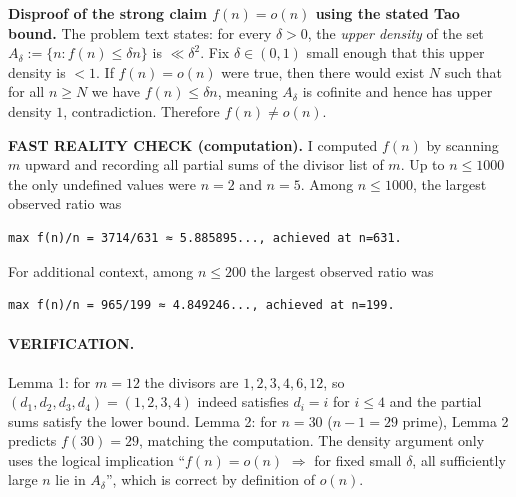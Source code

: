 \textbf{Disproof of the strong claim $f(n)=o(n)$ using the stated Tao bound.}
The problem text states: for every $\delta>0$, the \emph{upper density} of the set
$A_\delta:=\{n: f(n)\le \delta n\}$ is $\ll \delta^2$.
Fix $\delta\in(0,1)$ small enough that this upper density is $<1$.
If $f(n)=o(n)$ were true, then there would exist $N$ such that for all $n\ge N$ we have $f(n)\le \delta n$, meaning $A_\delta$ is cofinite and hence has upper density $1$, contradiction.
Therefore $f(n)\ne o(n)$.

\textbf{FAST REALITY CHECK (computation).}
I computed $f(n)$ by scanning $m$ upward and recording all partial sums of the divisor list of $m$.
Up to $n\le 1000$ the only undefined values were $n=2$ and $n=5$.
Among $n\le 1000$, the largest observed ratio was
\begin{verbatim}
max f(n)/n = 3714/631 ≈ 5.885895..., achieved at n=631.
\end{verbatim}
For additional context, among $n\le 200$ the largest observed ratio was
\begin{verbatim}
max f(n)/n = 965/199 ≈ 4.849246..., achieved at n=199.
\end{verbatim}

\paragraph{VERIFICATION.}
Lemma 1: for $m=12$ the divisors are $1,2,3,4,6,12$, so $(d_1,d_2,d_3,d_4)=(1,2,3,4)$ indeed satisfies $d_i=i$ for $i\le 4$ and the partial sums satisfy the lower bound.
Lemma 2: for $n=30$ ($n-1=29$ prime), Lemma 2 predicts $f(30)=29$, matching the computation.
The density argument only uses the logical implication “$f(n)=o(n)$ $\Rightarrow$ for fixed small $\delta$, all sufficiently large $n$ lie in $A_\delta$”, which is correct by definition of $o(n)$.

